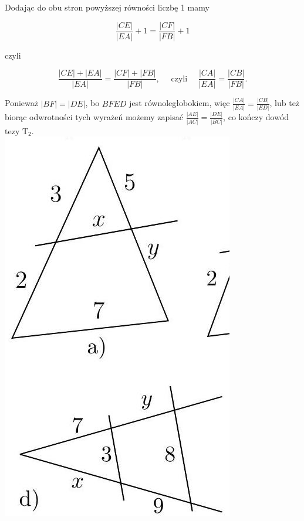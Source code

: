 \documentclass[10pt]{article}
\begin{document}
Dodając do obu stron powyższej równości liczbę 1 mamy

\[
\frac{|C E|}{|E A|}+1=\frac{|C F|}{|F B|}+1
\]

czyli

\[
\frac{|C E|+|E A|}{|E A|}=\frac{|C F|+|F B|}{|F B|}, \quad \text { czyli } \quad \frac{|C A|}{|E A|}=\frac{|C B|}{|F B|} .
\]

Ponieważ \(|B F|=|D E|\), bo \(B F E D\) jest równoległobokiem, więc \(\frac{|C A|}{|E A|}=\frac{|C B|}{|E D|}\), lub też biorąc odwrotności tych wyrażeń możemy zapisać \(\frac{|A E|}{|A C|}=\frac{|D E|}{|B C|}\), co kończy dowód tezy \(\mathrm{T}_{2}\).\\
\includegraphics[max width=\textwidth, center]{2024_11_21_e9b4faa005d5be2cc318g-008}\\
\end{document}
